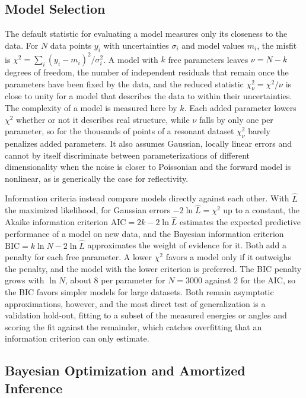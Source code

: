 \subsection{Model Selection}\label{sec:model-selection}

The default statistic for evaluating a model measures only its closeness to the data. For \(N\) data points \(y_{i}\) with uncertainties \(\sigma_{i}\) and model values \(m_{i}\), the misfit is \(\chi^{2} = \sum_{i}(y_{i} - m_{i})^{2}/\sigma_{i}^{2}\). A model with \(k\) free parameters leaves \(\nu = N - k\) degrees of freedom, the number of independent residuals that remain once the parameters have been fixed by the data, and the reduced statistic \(\chi_{\nu}^{2} = \chi^{2}/\nu\) is close to unity for a model that describes the data to within their uncertainties. The complexity of a model is measured here by \(k\). Each added parameter lowers \(\chi^{2}\) whether or not it describes real structure, while \(\nu\) falls by only one per parameter, so for the thousands of points of a resonant dataset \(\chi_{\nu}^{2}\) barely penalizes added parameters. It also assumes Gaussian, locally linear errors and cannot by itself discriminate between parameterizations of different dimensionality when the noise is closer to Poissonian and the forward model is nonlinear, as is generically the case for reflectivity.

Information criteria instead compare models directly against each other. With \(\hat{L}\) the maximized likelihood, for Gaussian errors \(- 2\ln\hat{L} = \chi^{2}\) up to a constant, the Akaike information criterion \(\mathrm{AIC} = 2k - 2\ln\hat{L}\) estimates the expected predictive performance of a model on new data, and the Bayesian information criterion \(\mathrm{BIC} = k\ln N - 2\ln\hat{L}\) approximates the weight of evidence for it. Both add a penalty for each free parameter. A lower \(\chi^{2}\) favors a model only if it outweighs the penalty, and the model with the lower criterion is preferred. The BIC penalty grows with \(\ln N\), about 8 per parameter for \(N = 3000\) against 2 for the AIC, so the BIC favors simpler models for large datasets. Both remain asymptotic approximations, however, and the most direct test of generalization is a validation hold-out, fitting to a subset of the measured energies or angles and scoring the fit against the remainder, which catches overfitting that an information criterion can only estimate.

\subsection{Bayesian Optimization and Amortized Inference}\label{sec:bayesian-optimization-and-amortized-inference}

